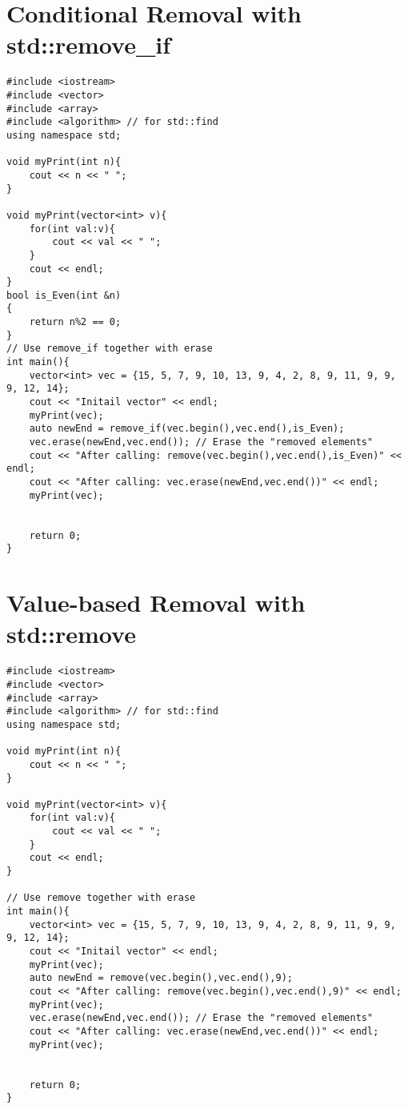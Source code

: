 \documentclass[12pt]{article}
\begin{document}
\section*{Conditional Removal with std::remove_if}
\begin{verbatim}
#include <iostream>
#include <vector>
#include <array>
#include <algorithm> // for std::find
using namespace std;

void myPrint(int n){
    cout << n << " ";
}

void myPrint(vector<int> v){
    for(int val:v){
        cout << val << " ";
    }
    cout << endl;
}
bool is_Even(int &n)
{
    return n%2 == 0;
}
// Use remove_if together with erase
int main(){
    vector<int> vec = {15, 5, 7, 9, 10, 13, 9, 4, 2, 8, 9, 11, 9, 9, 9, 12, 14};
    cout << "Initail vector" << endl;
    myPrint(vec);
    auto newEnd = remove_if(vec.begin(),vec.end(),is_Even);
    vec.erase(newEnd,vec.end()); // Erase the "removed elements"
    cout << "After calling: remove(vec.begin(),vec.end(),is_Even)" << endl;
    cout << "After calling: vec.erase(newEnd,vec.end())" << endl;
    myPrint(vec);

    
    return 0;
}
\end{verbatim}


\section*{Value-based Removal with std::remove}
\begin{verbatim}
#include <iostream>
#include <vector>
#include <array>
#include <algorithm> // for std::find
using namespace std;

void myPrint(int n){
    cout << n << " ";
}

void myPrint(vector<int> v){
    for(int val:v){
        cout << val << " ";
    }
    cout << endl;
}

// Use remove together with erase
int main(){
    vector<int> vec = {15, 5, 7, 9, 10, 13, 9, 4, 2, 8, 9, 11, 9, 9, 9, 12, 14};
    cout << "Initail vector" << endl;
    myPrint(vec);
    auto newEnd = remove(vec.begin(),vec.end(),9);
    cout << "After calling: remove(vec.begin(),vec.end(),9)" << endl;
    myPrint(vec);
    vec.erase(newEnd,vec.end()); // Erase the "removed elements"
    cout << "After calling: vec.erase(newEnd,vec.end())" << endl;
    myPrint(vec);

    
    return 0;
}
\end{verbatim}
\end{document}
